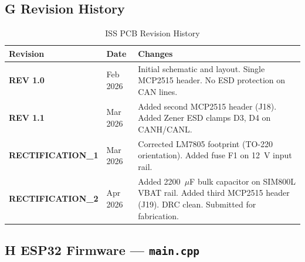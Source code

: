 \clearpage

\subsection*{G \quad Revision History}

\begin{table}[H]
\centering
\caption{ISS PCB Revision History}
\begin{tabular}{>{\bfseries}p{2.5cm} p{2.5cm} p{9cm}}
\toprule
Revision & Date & Changes \\
\midrule
REV 1.0       & Feb 2026 & Initial schematic and layout. Single MCP2515 header. No ESD protection on CAN lines. \\
REV 1.1       & Mar 2026 & Added second MCP2515 header (J18). Added Zener ESD clamps D3, D4 on CANH/CANL. \\
RECTIFICATION\_1 & Mar 2026 & Corrected LM7805 footprint (TO-220 orientation). Added fuse F1 on 12~V input rail. \\
RECTIFICATION\_2 & Apr 2026 & Added 2200~$\mu$F bulk capacitor on SIM800L VBAT rail. Added third MCP2515 header (J19). DRC clean. Submitted for fabrication. \\
\bottomrule
\end{tabular}
\end{table}

\clearpage

\subsection*{H \quad ESP32 Firmware --- \texttt{main.cpp}}

\lstset{language=C++, style=bakocode}

